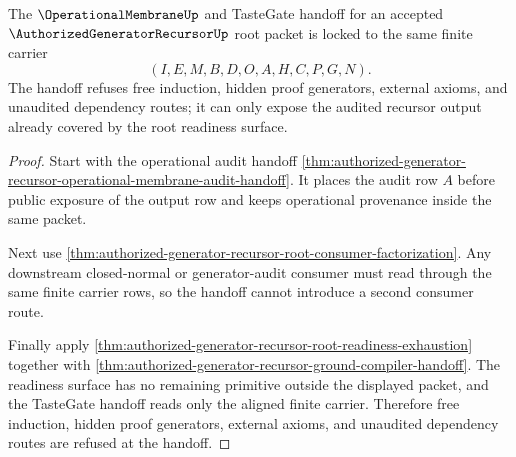 \begin{theorem}
\label{thm:authorized-generator-recursor-root-audit-handoff-lock}
The $\OperationalMembraneUp$ and TasteGate handoff for an accepted $\AuthorizedGeneratorRecursorUp$ root packet is locked to the same finite carrier
$$
(I,E,M,B,D,O,A,H,C,P,G,N).
$$
The handoff refuses free induction, hidden proof generators, external axioms, and unaudited dependency routes; it can only expose the audited recursor output already covered by the root readiness surface.
\end{theorem}
\begin{proof}
Start with the operational audit handoff \autoref{thm:authorized-generator-recursor-operational-membrane-audit-handoff}. It places the audit row $A$ before public exposure of the output row and keeps operational provenance inside the same packet.

Next use \autoref{thm:authorized-generator-recursor-root-consumer-factorization}. Any downstream closed-normal or generator-audit consumer must read through the same finite carrier rows, so the handoff cannot introduce a second consumer route.

Finally apply \autoref{thm:authorized-generator-recursor-root-readiness-exhaustion} together with \autoref{thm:authorized-generator-recursor-ground-compiler-handoff}. The readiness surface has no remaining primitive outside the displayed packet, and the TasteGate handoff reads only the aligned finite carrier. Therefore free induction, hidden proof generators, external axioms, and unaudited dependency routes are refused at the handoff.
\end{proof}

